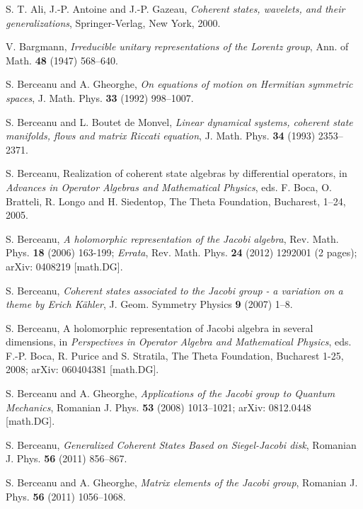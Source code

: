 \documentclass[12pt]{amsart}
\numberwithin{equation}{section}
\theoremstyle{definition}
\begin{document}
  
\begin{thebibliography}{99}

S. T. Ali, J.-P. Antoine and J.-P. Gazeau, {\it Coherent states,
wavelets, and their generalizations}, Springer-Verlag, New York, 2000.

V. Bargmann, {\it Irreducible unitary representations of the
Lorentz group},  Ann. of Math.  {\bf 48} (1947) 568--640.

S. Berceanu  and A. Gheorghe,  {\it On equations of motion on Hermitian
 symmetric  spaces},
  J. Math. Phys.   {\bf 33}  (1992)  998--1007.

S.  Berceanu   and  L. Boutet de Monvel,  
{\it  Linear dynamical systems, coherent
state manifolds, flows and matrix Riccati equation},
   J. Math. Phys.  {\bf 34}  (1993) 2353--2371.

S. Berceanu,    Realization of coherent state algebras
by differential operators,
in  {\it {Advances in Operator Algebras and Mathematical Physics}},
eds.   F. Boca, O. Bratteli, R. Longo and  H. Siedentop, 
The Theta Foundation, Bucharest, 1--24,  2005.

 S. Berceanu,  {\it A holomorphic representation of the Jacobi algebra},
Rev. Math. Phys.  {\bf 18}  (2006) 163-199; {\it  Errata},   Rev.  Math. Phys.
{\bf 24}  (2012) 1292001 (2 pages);  arXiv: 0408219   [math.DG].

 S. Berceanu, {\it Coherent states associated to the Jacobi group -} 
{\it a variation on a theme by Erich K\"ahler},
 J. Geom.  Symmetry  Physics {\bf 9} (2007) 1--8.

S. Berceanu,   A holomorphic 
representation of Jacobi algebra in several 
dimensions, in {\it { Perspectives in Operator Algebra and Mathematical
Physics}},  eds.  F.-P. Boca, R. Purice and  S. Stratila, The Theta Foundation,
 Bucharest 1-25, 2008;  arXiv: 060404381 [math.DG].

S. Berceanu  and A. Gheorghe, {\it Applications of the Jacobi group to
Quantum Mechanics},  Romanian J.  Phys. {\bf 53}  (2008)
 1013--1021; arXiv: 0812.0448  [math.DG].

 S. Berceanu, {\it Generalized Coherent States Based on Siegel-Jacobi disk},
   Romanian J. Phys. {\bf 56}  (2011) 856--867.  

 S. Berceanu  and  A. Gheorghe, {\it Matrix elements of  the Jacobi
   group}, Romanian J. Phys. {\bf 56}   (2011)  1056--1068.   


\end{thebibliography}
\end{document}
